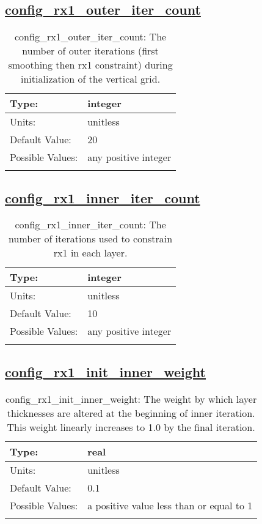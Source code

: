 \subsection[config\_rx1\_outer\_iter\_count]{\hyperref[sec:nm_tab_constrain_Haney_number]{config\_rx1\_outer\_iter\_count}}
\label{subsec:nm_sec_config_rx1_outer_iter_count}
\begin{center}
\begin{longtable}{| p{2.0in} || p{4.0in} |}
    \hline
    Type: & integer \\
    \hline
    Units: & \si{unitless} \\
    \hline
    Default Value: & 20 \\
    \hline
    Possible Values: & any positive integer \\
    \hline
    \caption{config\_rx1\_outer\_iter\_count: The number of outer iterations (first smoothing then rx1 constraint) during initialization of the vertical grid.}
\end{longtable}
\end{center}
\subsection[config\_rx1\_inner\_iter\_count]{\hyperref[sec:nm_tab_constrain_Haney_number]{config\_rx1\_inner\_iter\_count}}
\label{subsec:nm_sec_config_rx1_inner_iter_count}
\begin{center}
\begin{longtable}{| p{2.0in} || p{4.0in} |}
    \hline
    Type: & integer \\
    \hline
    Units: & \si{unitless} \\
    \hline
    Default Value: & 10 \\
    \hline
    Possible Values: & any positive integer \\
    \hline
    \caption{config\_rx1\_inner\_iter\_count: The number of iterations used to constrain rx1 in each layer.}
\end{longtable}
\end{center}
\subsection[config\_rx1\_init\_inner\_weight]{\hyperref[sec:nm_tab_constrain_Haney_number]{config\_rx1\_init\_inner\_weight}}
\label{subsec:nm_sec_config_rx1_init_inner_weight}
\begin{center}
\begin{longtable}{| p{2.0in} || p{4.0in} |}
    \hline
    Type: & real \\
    \hline
    Units: & \si{unitless} \\
    \hline
    Default Value: & 0.1 \\
    \hline
    Possible Values: & a positive value less than or equal to 1 \\
    \hline
    \caption{config\_rx1\_init\_inner\_weight: The weight by which layer thicknesses are altered at the beginning of inner iteration. This weight linearly increases to 1.0 by the final iteration.}
\end{longtable}
\end{center}
